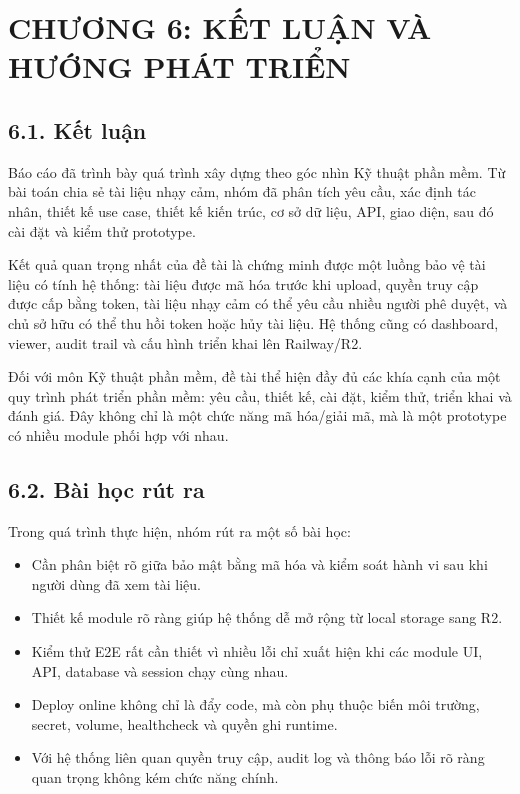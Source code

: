 \chapter*{CHƯƠNG 6: KẾT LUẬN VÀ HƯỚNG PHÁT TRIỂN}
{}

\section*{6.1. Kết luận}
{}

Báo cáo đã trình bày quá trình xây dựng \projectname{} theo góc nhìn Kỹ thuật phần mềm. Từ bài toán chia sẻ tài liệu nhạy cảm, nhóm đã phân tích yêu cầu, xác định tác nhân, thiết kế use case, thiết kế kiến trúc, cơ sở dữ liệu, API, giao diện, sau đó cài đặt và kiểm thử prototype.

Kết quả quan trọng nhất của đề tài là chứng minh được một luồng bảo vệ tài liệu có tính hệ thống: tài liệu được mã hóa trước khi upload, quyền truy cập được cấp bằng token, tài liệu nhạy cảm có thể yêu cầu nhiều người phê duyệt, và chủ sở hữu có thể thu hồi token hoặc hủy tài liệu. Hệ thống cũng có dashboard, viewer, audit trail và cấu hình triển khai lên Railway/R2.

Đối với môn Kỹ thuật phần mềm, đề tài thể hiện đầy đủ các khía cạnh của một quy trình phát triển phần mềm: yêu cầu, thiết kế, cài đặt, kiểm thử, triển khai và đánh giá. Đây không chỉ là một chức năng mã hóa/giải mã, mà là một prototype có nhiều module phối hợp với nhau.

\section*{6.2. Bài học rút ra}
{}

Trong quá trình thực hiện, nhóm rút ra một số bài học:

\begin{itemize}
  \item Cần phân biệt rõ giữa bảo mật bằng mã hóa và kiểm soát hành vi sau khi người dùng đã xem tài liệu.
  \item Thiết kế module rõ ràng giúp hệ thống dễ mở rộng từ local storage sang R2.
  \item Kiểm thử E2E rất cần thiết vì nhiều lỗi chỉ xuất hiện khi các module UI, API, database và session chạy cùng nhau.
  \item Deploy online không chỉ là đẩy code, mà còn phụ thuộc biến môi trường, secret, volume, healthcheck và quyền ghi runtime.
  \item Với hệ thống liên quan quyền truy cập, audit log và thông báo lỗi rõ ràng quan trọng không kém chức năng chính.
\end{itemize}

